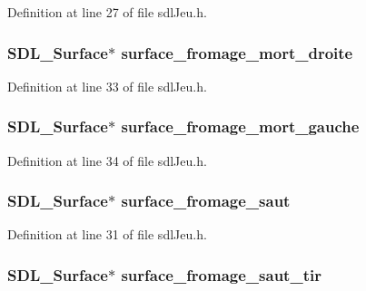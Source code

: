 Definition at line 27 of file sdl\-Jeu.\-h.

\hypertarget{structsdl_jeu_ae7b0c7c4f3c21bed15109564ca380a64}{
\subsubsection[{surface\-\_\-fromage\-\_\-mort\-\_\-droite}]{\setlength{\rightskip}{0pt plus 5cm}S\-D\-L\-\_\-\-Surface$\ast$ surface\-\_\-fromage\-\_\-mort\-\_\-droite}}\label{structsdl_jeu_ae7b0c7c4f3c21bed15109564ca380a64}


Definition at line 33 of file sdl\-Jeu.\-h.

\hypertarget{structsdl_jeu_ab0f132d65433e47f88112b705dc1b3cb}{
\subsubsection[{surface\-\_\-fromage\-\_\-mort\-\_\-gauche}]{\setlength{\rightskip}{0pt plus 5cm}S\-D\-L\-\_\-\-Surface$\ast$ surface\-\_\-fromage\-\_\-mort\-\_\-gauche}}\label{structsdl_jeu_ab0f132d65433e47f88112b705dc1b3cb}


Definition at line 34 of file sdl\-Jeu.\-h.

\hypertarget{structsdl_jeu_abfef78dde33045acb50cc005888ef184}{
\subsubsection[{surface\-\_\-fromage\-\_\-saut}]{\setlength{\rightskip}{0pt plus 5cm}S\-D\-L\-\_\-\-Surface$\ast$ surface\-\_\-fromage\-\_\-saut}}\label{structsdl_jeu_abfef78dde33045acb50cc005888ef184}


Definition at line 31 of file sdl\-Jeu.\-h.

\hypertarget{structsdl_jeu_af661b67f0b78d8093091c652a6bc0bbc}{
\subsubsection[{surface\-\_\-fromage\-\_\-saut\-\_\-tir}]{\setlength{\rightskip}{0pt plus 5cm}S\-D\-L\-\_\-\-Surface$\ast$ surface\-\_\-fromage\-\_\-saut\-\_\-tir}}\label{structsdl_jeu_af661b67f0b78d8093091c652a6bc0bbc}


